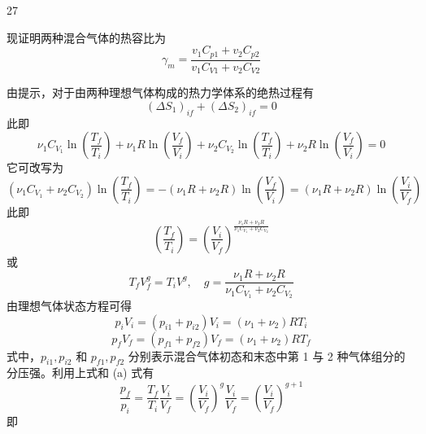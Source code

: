 \begin{solution}{27}
\begin{subsolution}
    现证明两种混合气体的热容比为
    \begin{equation}
      \gamma_{m} = \frac{v_{1} C_{p 1} + v_{2} C_{p 2}}{v_{1} C_{V 1} + v_{2} C_{V 2}}
      \label{eq:13.p27}
    \end{equation}
    \begin{subproblem}[证法（a）]
      由提示，对于由两种理想气体构成的热力学体系的绝热过程有
      \begin{equation}
        (\Delta S_{1})_{i f} + (\Delta S_{2})_{i f} = 0
      \end{equation}
      此即
      \begin{equation}
        \nu_{1} C_{V_{1}} \ln (\frac{T_{f}}{T_{i}}) + \nu_{1} R \ln (\frac{V_{f}}{V_{i}}) + \nu_{2} C_{V_{2}} \ln (\frac{T_{f}}{T_{i}}) + \nu_{2} R \ln (\frac{V_{f}}{V_{i}}) = 0
      \end{equation}
      它可改写为
      \begin{equation}
        (\nu_{1} C_{V_{1}} + \nu_{2} C_{V_{2}}) \ln (\frac{T_{f}}{T_{i}}) = - (\nu_{1} R + \nu_{2} R) \ln (\frac{V_{f}}{V_{i}}) = (\nu_{1} R + \nu_{2} R) \ln (\frac{V_{i}}{V_{f}})
      \end{equation}
      此即
      \begin{equation}
        (\frac{T_{f}}{T_{i}}) = (\frac{V_{i}}{V_{f}})^{\frac{\nu_{1} R + \nu_{2} R}{\nu_{1} C_{V_{1}} + \nu_{2} C_{V_{2}}}}
      \end{equation}
      或
      \begin{equation}
        T_{f} V_{f}^{g} = T_{i} V^{g}, \quad g = \frac{\nu_{1} R + \nu_{2} R}{\nu_{1} C_{V_{1}} + \nu_{2} C_{V_{2}}}
        \label{eq:a1}
      \end{equation}
      由理想气体状态方程可得
      \begin{equation}
        p_{i} V_{i} = (p_{i 1} + p_{i 2}) V_{i} = (\nu_{1} + \nu_{2}) R T_{i}
      \end{equation}
      \begin{equation}
        p_{f} V_{f} = (p_{f 1} + p_{f 2}) V_{f} = (\nu_{1} + \nu_{2}) R T_{f}
      \end{equation}
      式中，$p_{i1}, p_{i2}$ 和 $p_{f1}, p_{f2}$ 分别表示混合气体初态和末态中第 1 与 2 种气体组分的分压强。利用上式和 (a) 式有
      \begin{equation}
        \frac{p_{f}}{p_{i}} = \frac{T_{f}}{T_{i}} \frac{V_{i}}{V_{f}} = (\frac{V_{i}}{V_{f}})^{g} \frac{V_{i}}{V_{f}} = (\frac{V_{i}}{V_{f}})^{g + 1}
      \end{equation}
      即
      \begin{equation}

\end{equation}
\end{subproblem}
\end{subsolution}
\end{solution}
